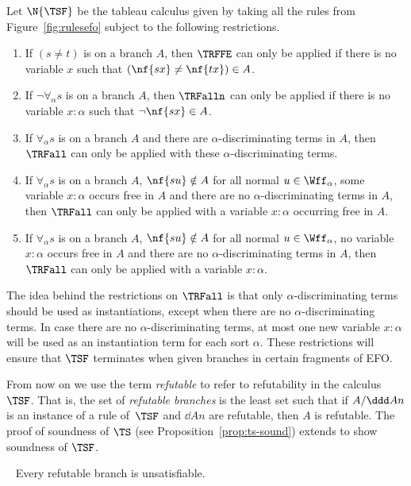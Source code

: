 Let $\N{\TSF}$ be the tableau calculus given by taking
all the rules from Figure~\ref{fig:rulesefo} 
subject to the following restrictions.
\begin{enumerate}[$\bullet$]
\item If $(s{\neq} t)$ is on a branch $A$, then
  $\TRFFE$ can only be applied if there is no variable $x$ such that $(\nf{sx}\neq\nf{tx})\in A$.
\item If $\neg\forall_{\!\alpha} s$ is on a branch $A$, then $\TRFalln$ can only be applied if 
  there is no variable $x:\alpha$ such that $\neg\nf{sx}\in A$.
\item If $\forall_{\!\alpha} s$ is on a branch $A$ and there are $\alpha$-discriminating terms in $A$,
  then $\TRFall$ can only be applied with these $\alpha$-discriminating terms. 
\item If $\forall_{\!\alpha} s$ is on a branch $A$,
  $\nf{su}\notin A$ for all normal $u\in\Wff_\alpha$,
  some variable $x:\alpha$ occurs free in $A$
  and there are no $\alpha$-discriminating terms in $A$,
  then $\TRFall$ can only be applied with a variable $x:\alpha$ occurring free in $A$.
\item If $\forall_{\!\alpha} s$ is on a branch $A$,
  $\nf{su}\notin A$ for all normal $u\in\Wff_\alpha$,
  no variable $x:\alpha$ occurs free in $A$
  and there are no $\alpha$-discriminating terms in $A$,
  then $\TRFall$ can only be applied with a variable $x:\alpha$.
\end{enumerate}
The idea behind the restrictions on $\TRFall$ is that only $\alpha$-discriminating terms should
be used as instantiations, except when there are no $\alpha$-discriminating terms.
In case there are no $\alpha$-discriminating terms, at most one new variable $x:\alpha$
will be used as an instantiation term for each sort $\alpha$.
These restrictions will ensure that $\TSF$ terminates when given branches in certain fragments of EFO.

From now on we use the term \emph{refutable} to refer to refutability in the calculus $\TSF$.
That is, the set of \emph{refutable branches} is the least set such that
if $A/\ddd A n$ is
an instance of a rule of~$\TSF$ and $\dd A n$ are
refutable, then $A$ is refutable.
The proof of soundness of $\TS$ (see Proposition~\ref{prop:ts-sound}) extends to show soundness of $\TSF$.

\begin{prop}
  \label{prop-e-soundness}~
  Every refutable branch is unsatisfiable.
\end{prop}

